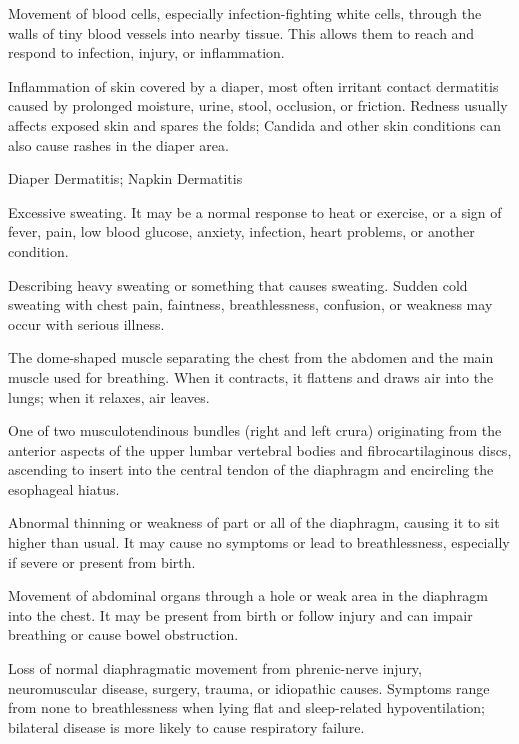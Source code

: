  Movement of blood cells, especially infection-fighting white cells, through the walls of tiny blood vessels into nearby tissue. This allows them to reach and respond to infection, injury, or inflammation.

 Inflammation of skin covered by a diaper, most often irritant contact dermatitis caused by prolonged moisture, urine, stool, occlusion, or friction. Redness usually affects exposed skin and spares the folds; Candida and other skin conditions can also cause rashes in the diaper area.

\synonyms
Diaper Dermatitis; Napkin Dermatitis

 Excessive sweating. It may be a normal response to heat or exercise, or a sign of fever, pain, low blood glucose, anxiety, infection, heart problems, or another condition.

 Describing heavy sweating or something that causes sweating. Sudden cold sweating with chest pain, faintness, breathlessness, confusion, or weakness may occur with serious illness.

 The dome-shaped muscle separating the chest from the abdomen and the main muscle used for breathing. When it contracts, it flattens and draws air into the lungs; when it relaxes, air leaves.

 One of two musculotendinous bundles (right and left crura) originating from the anterior aspects of the upper lumbar vertebral bodies and fibrocartilaginous discs, ascending to insert into the central tendon of the diaphragm and encircling the esophageal hiatus.

 Abnormal thinning or weakness of part or all of the diaphragm, causing it to sit higher than usual. It may cause no symptoms or lead to breathlessness, especially if severe or present from birth.

 Movement of abdominal organs through a hole or weak area in the diaphragm into the chest. It may be present from birth or follow injury and can impair breathing or cause bowel obstruction.

 Loss of normal diaphragmatic movement from phrenic-nerve injury, neuromuscular disease, surgery, trauma, or idiopathic causes. Symptoms range from none to breathlessness when lying flat and sleep-related hypoventilation; bilateral disease is more likely to cause respiratory failure.

